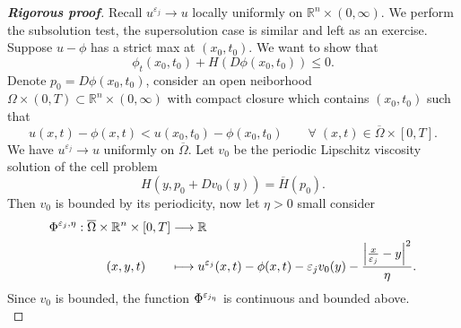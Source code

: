 \documentclass[12pt, oneside]{amsart}  	%
\begin{document}
\begin{proof}[\textbf{Rigorous proof}] Recall $u^{\varepsilon_j}\longrightarrow u$ locally uniformly on $\mathbb{R}^n\times (0,\infty)$. We perform the subsolution test, the supersolution case is similar and left as an exercise. Suppose $u-\phi$ has a strict max at $(x_0, t_0)$. We want to show that
\begin{equation*}
\phi_t(x_0,t_0) + H\left(D\phi(x_0,t_0)\right) \leq 0.
\end{equation*}
Denote $p_0 = D\phi(x_0,t_0)$, consider an open neiborhood $\Omega\times (0,T) \subset \mathbb{R}^n \times (0,\infty)$ with compact closure which contains $(x_0,t_0)$ such that
\begin{equation*}
u(x,t) - \phi(x,t) < u\left(x_0,t_0\right)-\phi\left(x_0,t_0\right) \qquad\forall\;(x,t)\in \overline{\Omega}\times [0,T].
\end{equation*}
We have $u^{\varepsilon_j} \longrightarrow u$ uniformly on $\overline{\Omega}$. Let $v_0$ be the periodic Lipschitz viscosity solution of the cell problem
\begin{equation*}
H(y, p_0+Dv_0(y)) = \overline{H}(p_0).
\end{equation*}
Then $v_0$ is bounded by its periodicity, now let $\eta >0$ small consider
\begin{align*}
\Phi^{\varepsilon_j,\eta}: \overline{\Omega}\times\mathbb{R}^n\times[0,T] &\longrightarrow \mathbb{R}\\
(x,y,t)\qquad&\longmapsto u^{\varepsilon_j}(x,t) -  \phi(x,t) -\varepsilon_j v_0(y) - \frac{\left|\frac{x}{\varepsilon_j} - y\right|^2}{\eta}.
\end{align*}
Since $v_0$ is bounded, the function $\Phi^{\varepsilon_{j_\eta}}$ is continuous and bounded above.\\


\end{proof}
\end{document}
